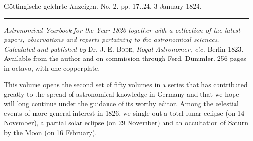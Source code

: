 \clearpage
{}
\hypertarget{native-635-lower}{}
\begin{center}\small Göttingische gelehrte Anzeigen. No. 2. pp. 17..24. 3 January 1824.\\[3pt]\rule{.72\linewidth}{.3pt}\end{center}

\emph{Astronomical Yearbook for the Year \textup{1826} together with a collection of the latest papers, observations and reports pertaining to the astronomical sciences. Calculated and published by} Dr. J. E. \textsc{Bode}, \emph{Royal Astronomer, etc.} Berlin 1823. Available from the author and on commission through Ferd. Dümmler. 256 pages in octavo, with one copperplate.

This volume opens the second set of fifty volumes in a series that has contributed greatly to the spread of astronomical knowledge in Germany and that we hope will long continue  under the guidance of its worthy editor. Among the celestial events of more general interest in 1826, we single out a total lunar eclipse (on 14 November), a partial solar eclipse (on 29 November) and an occultation of Saturn by the Moon (on 16 February).

